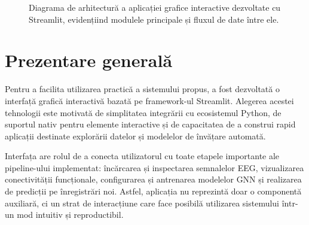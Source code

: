 \documentclass[12pt,a4paper]{report}
\theoremstyle{definition}
\theoremstyle{remark}
\begin{document}
\begin{figure}[H]
\caption{Diagrama de arhitectură a aplicației grafice interactive dezvoltate cu Streamlit, evidențiind modulele principale și fluxul de date între ele.}
\label{fig:app_diagram}
\end{figure}

\section{Prezentare generală}

Pentru a facilita utilizarea practică a sistemului propus, a fost dezvoltată o interfață grafică interactivă bazată pe framework-ul Streamlit. Alegerea acestei tehnologii este motivată de simplitatea integrării cu ecosistemul Python, de suportul nativ pentru elemente interactive și de capacitatea de a construi rapid aplicații destinate explorării datelor și modelelor de învățare automată.

Interfața are rolul de a conecta utilizatorul cu toate etapele importante ale pipeline-ului implementat: încărcarea și inspectarea semnalelor EEG, vizualizarea conectivității funcționale, configurarea și antrenarea modelelor GNN și realizarea de predicții pe înregistrări noi. Astfel, aplicația nu reprezintă doar o componentă auxiliară, ci un strat de interacțiune care face posibilă utilizarea sistemului într-un mod intuitiv și reproductibil.
\end{document}
